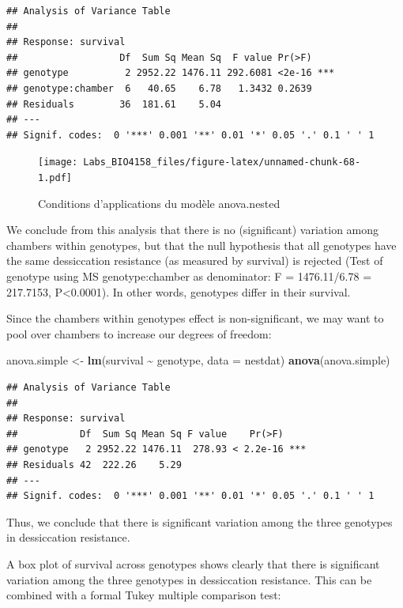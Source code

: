 \documentclass[
  12pt,
]{book}
\newenvironment{Shaded}{\begin{snugshade}}{\end{snugshade}}
\newcommand{\DataTypeTok}[1]{\textcolor[rgb]{0.13,0.29,0.53}{#1}}
\newcommand{\KeywordTok}[1]{\textcolor[rgb]{0.13,0.29,0.53}{\textbf{#1}}}
\newcommand{\NormalTok}[1]{#1}
\newcommand{\OperatorTok}[1]{\textcolor[rgb]{0.81,0.36,0.00}{\textbf{#1}}}
\newcommand{\StringTok}[1]{\textcolor[rgb]{0.31,0.60,0.02}{#1}}
\begin{document}
\begin{verbatim}
## Analysis of Variance Table
## 
## Response: survival
##                  Df  Sum Sq Mean Sq  F value Pr(>F)    
## genotype          2 2952.22 1476.11 292.6081 <2e-16 ***
## genotype:chamber  6   40.65    6.78   1.3432 0.2639    
## Residuals        36  181.61    5.04                    
## ---
## Signif. codes:  0 '***' 0.001 '**' 0.01 '*' 0.05 '.' 0.1 ' ' 1
\end{verbatim}

\begin{figure}
\centering
\texttt{[image: Labs\_BIO4158\_files/figure-latex/unnamed-chunk-68-1.pdf]}
\caption{\label{fig:unnamed-chunk-68}Conditions d'applications du modèle anova.nested}
\end{figure}

We conclude from this analysis that there is no (significant) variation among chambers within genotypes, but that the null hypothesis that all genotypes have the same dessiccation resistance (as measured by survival) is rejected (Test of genotype using MS genotype:chamber as denominator: F = 1476.11/6.78 = 217.7153, P\textless0.0001). In other words, genotypes differ in their survival.

Since the chambers within genotypes effect is non-significant, we may want to pool over chambers to increase our degrees of freedom:

\begin{Shaded}
\begin{Highlighting}[]
\NormalTok{anova.simple \textless{}{-}}\StringTok{ }\KeywordTok{lm}\NormalTok{(survival }\OperatorTok{\textasciitilde{}}\StringTok{ }\NormalTok{genotype, }\DataTypeTok{data =}\NormalTok{ nestdat)}
\KeywordTok{anova}\NormalTok{(anova.simple)}
\end{Highlighting}
\end{Shaded}

\begin{verbatim}
## Analysis of Variance Table
## 
## Response: survival
##           Df  Sum Sq Mean Sq F value    Pr(>F)    
## genotype   2 2952.22 1476.11  278.93 < 2.2e-16 ***
## Residuals 42  222.26    5.29                      
## ---
## Signif. codes:  0 '***' 0.001 '**' 0.01 '*' 0.05 '.' 0.1 ' ' 1
\end{verbatim}

Thus, we conclude that there is significant variation among the three genotypes in dessiccation resistance.

A box plot of survival across genotypes shows clearly that there is significant variation among the three genotypes in dessiccation resistance. This can be combined with a formal Tukey multiple comparison test:
\end{document}
